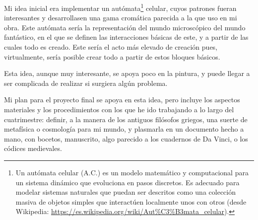 \documentclass[twoside,twocolumn]{article}
\begin{document}
Mi idea inicial era implementar un autómata\footnote{Un autómata celular
  (A.C.) es un modelo matemático y computacional para un sistema
  dinámico que evoluciona en pasos discretos. Es adecuado para modelar
  sistemas naturales que puedan ser descritos como una colección masiva
  de objetos simples que interactúen localmente unos con otros (desde
  Wikipedia:
  \url{https://es.wikipedia.org/wiki/Aut\%C3\%B3mata_celular}).} celular, cuyos patrones fueran interesantes y desarrollasen una gama
cromática parecida a la que uso en mi obra. Este autómata sería la
representación del mundo microscópico del mundo fantástico, en el que se
definen las interacciones básicas de este, y a partir de las cuales todo
es creado. Este sería el acto más elevado de creación pues,
virtualmente, sería posible crear todo a partir de estos bloques
básicos.

Esta idea, aunque muy interesante, se apoya poco en la pintura, y puede
llegar a ser complicada de realizar si surgiera algún problema.

Mi plan para el proyecto final se apoya en esta idea, pero incluye los
aspectos materiales y los procedimientos con los que he ido trabajando a
lo largo del cuatrimestre: definir, a la manera de los antiguos
filósofos griegos, una suerte de metafísica o cosmología para mi mundo,
y plasmarla en un documento hecho a mano, con bocetos, manuscrito, algo
parecido a los cuadernos de Da Vinci, o los códices medievales.\\

\end{document}
